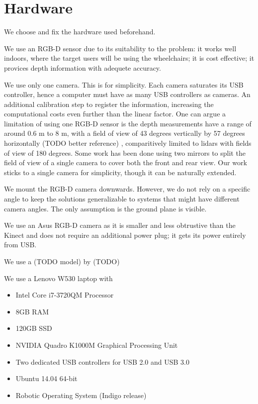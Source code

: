 \section{Hardware}
We choose and fix the hardware used beforehand.

We use an RGB-D sensor due to its suitability to the problem:
it works well indoors, where the target users will be using the wheelchairs; it
is cost effective; it provices depth information with adequete accuracy.

We use only one camera. This is for simplicity. Each camera saturates its USB
controller, hence a computer must have as many USB controllers as cameras.
An additional calibration step to register the information, increasing the
computational costs even further than the linear factor. 
One can argue a limitation of using one RGB-D sensor is the depth measurements
have a range of around 0.6 m to 8 m, with a field of view of 43 degrees
vertically by 57 degrees horizontally (TODO better reference) \cite{endres2014catadioptric},
comparitively limited to lidars with fields of view of 180 degrees. Some work
\cite{endres2014catadioptric} has been done using two mirrors to split the field
of view of a single camera to cover both the front and rear view. Our work
sticks to a single camera for simplicity, though it can be naturally extended.

We mount the RGB-D camera downwards. However, we do not rely on a specific angle
to keep the solutions generalizable to systems that might have different camera
angles. The only assumption is the ground plane is visible.

We use an Asus RGB-D camera as it is smaller and less obtrustive than the Kinect
and does not require an additional power plug; it gets its power entirely from
USB.


We use a (TODO model) by (TODO) 

We use a Lenovo W530 laptop with 
\begin{itemize}
\item Intel Core i7-3720QM Processor
\item 8GB RAM
\item 120GB SSD
\item NVIDIA Quadro K1000M Graphical Processing Unit
\item Two dedicated USB controllers for USB 2.0 and USB 3.0
\item Ubuntu 14.04 64-bit
\item Robotic Operating System (Indigo release)
\end{itemize}

